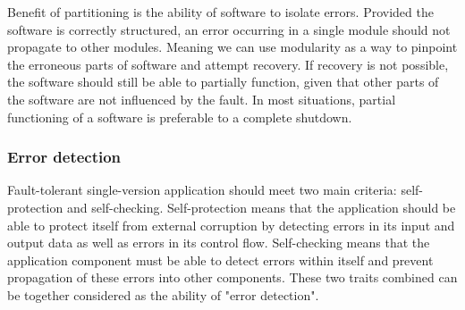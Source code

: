 


Benefit of partitioning is the ability of software to isolate errors. Provided the software is correctly structured, an error occurring in a single module should not propagate to other modules. Meaning we can use modularity as a way to pinpoint the erroneous parts of software and attempt recovery. If recovery is not possible, the software should still be able to partially function, given that other parts of the software are not influenced by the fault. In most situations, partial functioning of a software is preferable to a complete shutdown.

\subsubsection{Error detection}

Fault-tolerant single-version application should meet two main criteria: self-protection and self-checking. Self-protection means that the application should be able to protect itself from external corruption by detecting errors in its input and output data as well as errors in its control flow. Self-checking means that the application component must be able to detect errors within itself and prevent propagation of these errors into other components. These two traits combined can be together considered as the ability of "error detection".

